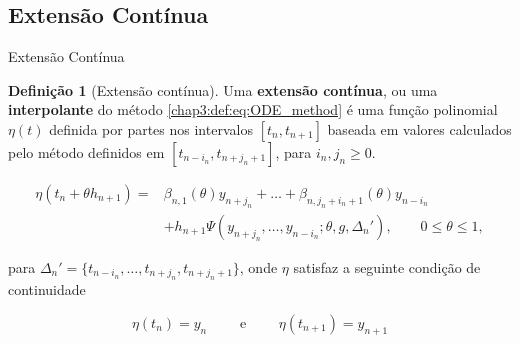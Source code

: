 \documentclass{beamer}
\theoremstyle{plain}
\theoremstyle{definition}
\newtheorem{defi}{Definição}
\begin{document}





\subsection{Extensão Contínua}
\begin{frame}{Extensão Contínua}


    \small
    \begin{defi}[Extensão contínua]
        Uma \textbf{extensão contínua}, ou uma \textbf{interpolante} do método \eqref{chap3:def:eq:ODE_method} é uma função polinomial $\eta(t)$ definida por partes nos intervalos $[t_n, t_{n+1}]$ baseada em valores calculados pelo método definidos em $[t_{n - i_n}, t_{n+j_n + 1}]$, para $i_n, j_n \geq 0$. 

        \scriptsize
        \begin{equation}
            \begin{split}
                \eta(t_n + \theta h_{n+1}) = &\beta_{n, 1} (\theta) y_{n + j_n} + \dots + \beta_{n, j_n + i_n + 1}(\theta) y_{n - i_n} \\
                                             &+ h_{n+1} \Psi(y_{n+j_n}, \dots, y_{n-i_n}; \theta, g, \Delta _n '), \qquad 0 \leq \theta \leq 1,
                                             \label{chap3:def:eq:Interpolant_extension}
            \end{split}
        \end{equation}

        \noindent
        \normalsize
        para $\Delta _n ' = \{ t_{n - i_n} , \dots, t_{n+j_n}, t_{n +j_n + 1} \}$, onde $\eta$ satisfaz a seguinte condição de continuidade

        \scriptsize
        \begin{equation}
            \eta(t_n) = y_n \qquad  \text{ e } \qquad \eta(t_{n+1}) = y_{n+1}
            \label{chap3:def:eq:continuity_condition}
        \end{equation}

    \end{defi}

\end{frame}
 

\end{document}
